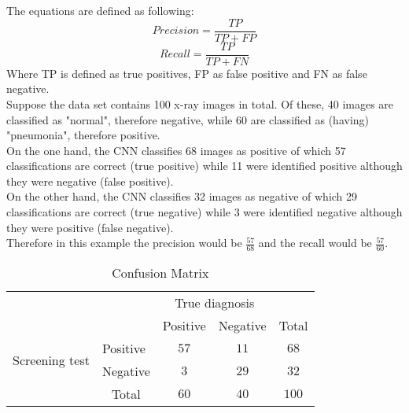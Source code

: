 The equations are defined as following:
\begin{equation}
Precision = \frac{TP}{TP +  FP}
\end{equation}
\begin{equation}
Recall = \frac{TP}{TP +  FN}
\end{equation}
Where TP is defined as true positives, FP as false positive and FN as false negative.\\
Suppose the data set contains 100 x-ray images in total. Of these, 40 images are classified as "normal", therefore negative, while 60 are classified as (having) "pneumonia", therefore positive.\\
On the one hand, the CNN classifies 68 images as positive of which 57 classifications are correct (true positive) while 11 were identified positive although they were negative (false positive).\\ 
On the other hand, the CNN classifies 32 images as negative of which 29 classifications are correct (true negative) while 3 were identified negative although they were positive (false negative).\\
Therefore in this example the precision would be $\frac{57}{68}$ and the recall would be $\frac{57}{60}$.


\begin{table}[h]
    \centering
    \begin{tabular}{l|l|c|c|c}
\multicolumn{2}{c}{}&\multicolumn{2}{c}{True diagnosis}&\\
\cline{3-4}
\multicolumn{2}{c|}{}&Positive&Negative&\multicolumn{1}{c}{Total}\\
\cline{2-4}
\multirow{2}{*}{Screening test}& Positive & \cellcolor{green}$57$ & \cellcolor{red}$11$ & $68$\\
\cline{2-4}
& Negative & \cellcolor{red}$3$ & \cellcolor{green}$29$ & $32$\\
\cline{2-4}
\multicolumn{1}{c}{} & \multicolumn{1}{c}{Total} & \multicolumn{1}{c}{$60$} & \multicolumn{    1}{c}{$40$} & \multicolumn{1}{c}{$100$}\\
\end{tabular}
    \caption{Confusion Matrix}
    \label{tab:my_label}
\end{table}

